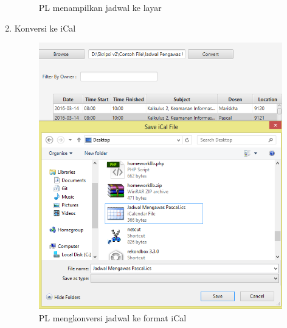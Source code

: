 \begin{enumerate}
\begin{figure}[H]
		\caption{PL menampilkan jadwal ke layar}
		\label{fig:jadwalKeLayar}
		\end{figure}
	\item Konversi ke iCal
		\begin{figure}[H]
		\centering
		\includegraphics[scale=0.5]{Gambar/konversiiCal}
		\caption{PL mengkonversi jadwal ke format iCal}
		\label{fig:konversiiCal}
		\end{figure}
		

\end{enumerate}
